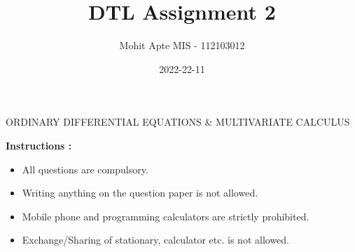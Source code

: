 \documentclass[12pt, a4paper]{article}
\title{\textbf{DTL Assignment 2}}
\date{2022-22-11}
\author{Mohit Apte MIS - 112103012}
\begin{document}
\maketitle

\begin{LARGE}
\begin{center}
ORDINARY DIFFERENTIAL EQUATIONS \& MULTIVARIATE CALCULUS
\end{center}
\end{LARGE}
\newpage

\begin{large}
\noindent \textbf {Instructions : }
\end{large}
\begin{itemize}
\item All questions are compulsory.
\item Writing anything on the question paper is not allowed.
\item Mobile phone and programming calculators are strictly prohibited.
\item Exchange/Sharing of stationary, calculator etc. is not allowed.

\end{itemize}
\end{document}
